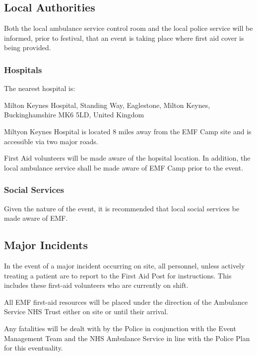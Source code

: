 \subsection{Local Authorities}
Both the local ambulance service control room and the local police service will
be informed, prior to festival, that an event is taking place where first aid
cover is being provided.

\subsubsection{Hospitals}

The nearest hospital is:

Milton Keynes Hospital, Standing Way, Eaglestone, Milton Keynes, Buckinghamshire MK6 5LD, United Kingdom

Miltyon Keynes Hospital is located 8 miles away from the EMF Camp site and is accessible via two major roads.

First Aid volunteers will be made aware of the hopsital location. In addition, the local ambulance service shall be made aware of EMF Camp prior to the event.

\subsubsection{Social Services}

Given the nature of the event, it is recommended that local social services be made aware of EMF. 

\subsection{Major Incidents}

In the event of a major incident occurring on site, all personnel, unless actively treating a patient are to report to the First Aid Post for instructions. This includes these first-aid volunteers who are currently on shift.

All EMF first-aid resources will be placed under the direction of the Ambulance Service NHS Trust either on site or until their arrival. 

Any fatalities will be dealt with by the Police in conjunction with the Event Management Team and the NHS Ambulance Service in line with the Police Plan for this eventuality.
